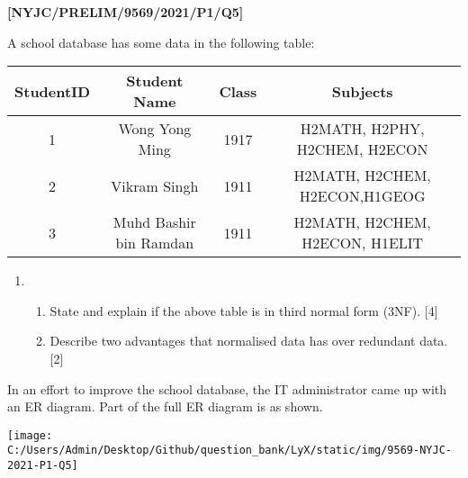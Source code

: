 \item \textbf{{[}NYJC/PRELIM/9569/2021/P1/Q5{]} }

A school database has some data in the following table: 
\noindent \begin{center}
\begin{tabular}{|c|c|c|c|}
\hline 
\textbf{StudentID} & \textbf{Student Name } & \textbf{Class } & \textbf{Subjects}\tabularnewline
\hline 
1  & Wong Yong Ming  & 1917  & H2MATH, H2PHY, H2CHEM, H2ECON\tabularnewline
\hline 
2  & Vikram Singh  & 1911  & H2MATH, H2CHEM, H2ECON,H1GEOG\tabularnewline
\hline 
3  & Muhd Bashir bin Ramdan  & 1911 & H2MATH, H2CHEM, H2ECON, H1ELIT\tabularnewline
\hline 
\end{tabular} 
\par\end{center}
\begin{enumerate}
\item {}
\begin{enumerate}
\item State and explain if the above table is in third normal form (3NF).
\hfill{}{[}4{]}
\item Describe two advantages that normalised data has over redundant data.
\hfill{}{[}2{]}
\end{enumerate}
\end{enumerate}
In an effort to improve the school database, the IT administrator
came up with an ER diagram. Part of the full ER diagram is as shown. 
\begin{center}
\texttt{[image: C:/Users/Admin/Desktop/Github/question\_bank/LyX/static/img/9569-NYJC-2021-P1-Q5]}
\par\end{center}

